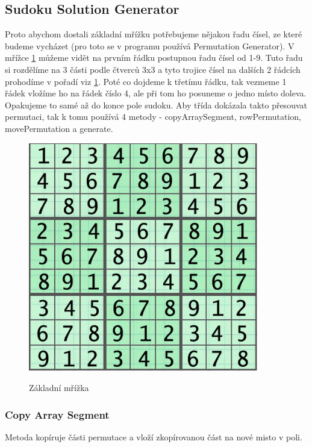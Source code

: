 \subsection{Sudoku Solution Generator}
Proto abychom dostali základní mřížku potřebujeme nějakou řadu čísel, ze které budeme vycházet (pro toto se v programu používá Permutation Generator). V mřížce \ref{fig:ZakladniGrid} můžeme vidět na prvním řádku postupnou řadu čísel od 1-9. Tuto řadu si rozdělíme na 3 části podle čtverců 3x3 a tyto trojice čísel na dalších 2 řádcích prohodíme v pořadí viz \ref{fig:ZakladniGrid}. Poté co dojdeme k třetímu řádku, tak vezmeme 1 řádek vložíme ho na řádek číslo 4, ale při tom ho posuneme o jedno místo doleva. Opakujeme to samé až do konce pole sudoku. Aby třída dokázala takto přesouvat permutaci, tak k tomu používá 4 metody - copyArraySegment, rowPermutation, movePermutation a generate.\\

\begin{figure}[h!]
    \centering
    \caption{Základní mřížka}
    \includegraphics{images/ZakladniGrid.PNG}
    \label{fig:ZakladniGrid}
\end{figure}

\subsubsection{Copy Array Segment}
Metoda kopíruje části permutace a vloží zkopírovanou část na nové misto v poli.

